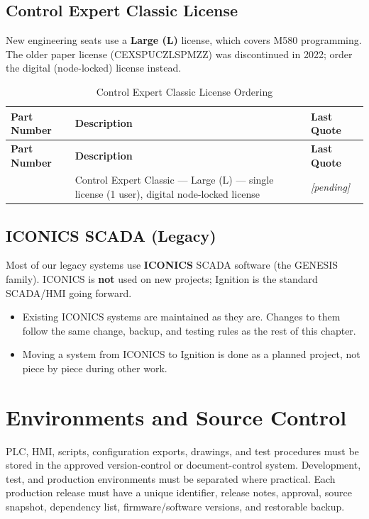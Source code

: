 \subsection{Control Expert Classic License}
New engineering seats use a \textbf{Large (L)} license, which covers M580 programming. The older paper license (CEXSPUCZLSPMZZ) was discontinued in 2022; order the digital (node-locked) license instead.
\begin{longtable}{@{}P{3.61cm}P{8.22cm}P{3.81cm}@{}}
\caption{Control Expert Classic License Ordering}\label{tab:ce-license} \\
\toprule
{}\textbf{Part Number} & \textbf{Description} & \textbf{Last Quote} \\
\midrule
\endfirsthead
\toprule
{}\textbf{Part Number} & \textbf{Description} & \textbf{Last Quote} \\
\midrule
\endhead
{} & Control Expert Classic --- Large (L) --- single license (1 user), digital node-locked license & \textit{\textcolor{noteorange}{[pending]}} \\
\bottomrule
\end{longtable}

\subsection{ICONICS SCADA (Legacy)}\label{sec:iconics}
Most of our legacy systems use \textbf{ICONICS} SCADA software (the GENESIS family). ICONICS is \textbf{not} used on new projects; Ignition is the standard SCADA/HMI going forward.
\begin{itemize}[itemsep=1pt]
  \item Existing ICONICS systems are maintained as they are. Changes to them follow the same change, backup, and testing rules as the rest of this chapter.
  \item Moving a system from ICONICS to Ignition is done as a planned project, not piece by piece during other work.
\end{itemize}

\section{Environments and Source Control}
PLC, HMI, scripts, configuration exports, drawings, and test procedures must be stored in the approved version-control or document-control system. Development, test, and production environments must be separated where practical. Each production release must have a unique identifier, release notes, approval, source snapshot, dependency list, firmware/software versions, and restorable backup.

